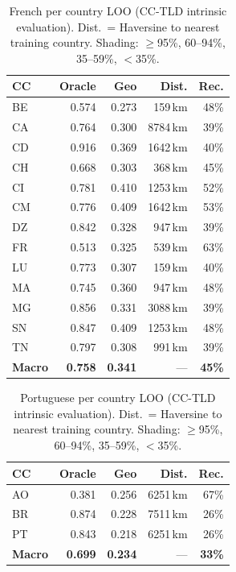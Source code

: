 \documentclass[11pt]{article}
\begin{document}
\begin{table}[t]
\centering
\small
\setlength{\tabcolsep}{4.5pt}
\begin{tabular}{lrrrr}
\toprule
\textbf{CC} & \textbf{Oracle} & \textbf{Geo} & \textbf{Dist.} & \textbf{Rec.}\\
\midrule
\rowcolor{mid}  BE & 0.574 & 0.273 &  159\,km & 48\% \\
\rowcolor{mid}  CA & 0.764 & 0.300 & 8784\,km & 39\% \\
\rowcolor{mid}  CD & 0.916 & 0.369 & 1642\,km & 40\% \\
\rowcolor{mid}  CH & 0.668 & 0.303 &  368\,km & 45\% \\
\rowcolor{mid}  CI & 0.781 & 0.410 & 1253\,km & 52\% \\
\rowcolor{mid}  CM & 0.776 & 0.409 & 1642\,km & 53\% \\
\rowcolor{mid}  DZ & 0.842 & 0.328 &  947\,km & 39\% \\
\rowcolor{high} FR & 0.513 & 0.325 &  539\,km & 63\% \\
\rowcolor{mid}  LU & 0.773 & 0.307 &  159\,km & 40\% \\
\rowcolor{mid}  MA & 0.745 & 0.360 &  947\,km & 48\% \\
\rowcolor{mid}  MG & 0.856 & 0.331 & 3088\,km & 39\% \\
\rowcolor{mid}  SN & 0.847 & 0.409 & 1253\,km & 48\% \\
\rowcolor{mid}  TN & 0.797 & 0.308 &  991\,km & 39\% \\
\midrule
\textbf{Macro} & \textbf{0.758} & \textbf{0.341} & --- & \textbf{45\%}\\
\bottomrule
\end{tabular}
\caption{French per country LOO (CC-TLD intrinsic evaluation).
  Dist.\ = Haversine to nearest training country.
  Shading: \colorbox{best}{$\geq$95\%}, \colorbox{high}{60--94\%}, \colorbox{mid}{35--59\%}, \colorbox{low}{$<$35\%}.}
\label{tab:fr}
\end{table}

\begin{table}[t]
\centering
\small
\setlength{\tabcolsep}{4.5pt}
\begin{tabular}{lrrrr}
\toprule
\textbf{CC} & \textbf{Oracle} & \textbf{Geo} & \textbf{Dist.} & \textbf{Rec.}\\
\midrule
\rowcolor{high} AO & 0.381 & 0.256 & 6251\,km & 67\% \\
\rowcolor{low}  BR & 0.874 & 0.228 & 7511\,km & 26\% \\
\rowcolor{low}  PT & 0.843 & 0.218 & 6251\,km & 26\% \\
\midrule
\textbf{Macro} & \textbf{0.699} & \textbf{0.234} & --- & \textbf{33\%}\\
\bottomrule
\end{tabular}
\caption{Portuguese per country LOO (CC-TLD intrinsic evaluation).
  Dist.\ = Haversine to nearest training country.
  Shading: \colorbox{best}{$\geq$95\%}, \colorbox{high}{60--94\%}, \colorbox{mid}{35--59\%}, \colorbox{low}{$<$35\%}.}
\label{tab:pt}
\end{table}
\end{document}
